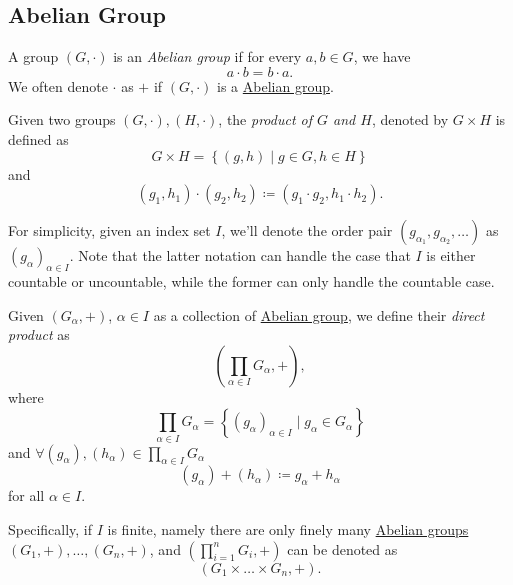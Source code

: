 \subsection{Abelian Group}
\begin{definition}\label{def:Abelian-group}
	A group \((G, \cdot)\) is an \emph{Abelian group} if for every \(a, b\in G\), we have
	\[
		a\cdot b = b\cdot a.
	\]
	We often denote \(\cdot\) as \(+\) if \((G, \cdot)\) is a \hyperref[def:Abelian-group]{Abelian group}.
\end{definition}

\begin{definition}\label{def:product-of-groups}
	Given two groups \((G, \cdot), (H, \cdot)\), the \emph{product of \(G\) and \(H\)}, denoted by \(G\times H\) is defined as
	\[
		G\times H = \left\{(g, h)\mid g\in G, h\in H\right\}
	\]
	and
	\[
		(g_1, h_1)\cdot (g_2, h_2)\coloneqq (g_1\cdot g_2, h_1\cdot h_2).
	\]
\end{definition}

\begin{notation}
	For simplicity, given an index set \(I\), we'll denote the order pair \((g_{\alpha _1}, g_{\alpha _2}, \ldots)\) as \((g_\alpha )_{\alpha \in I}\). Note that
	the latter notation can handle the case that \(I\) is either countable or uncountable, while the former can only handle the countable case.
\end{notation}

\begin{definition}\label{def:direct-product}
	Given \((G_\alpha , +)\), \(\alpha \in I\) as a collection of \hyperref[def:Abelian-group]{Abelian group}, we define their \emph{direct product} as
	\[
		\left(\prod\limits_{\alpha \in I}G_\alpha , + \right),
	\]
	where
	\[
		\prod\limits_{\alpha \in I} G_\alpha = \left\{(g_\alpha )_{\alpha \in I}\mid g_\alpha \in G_\alpha \right\}
	\]
	and \(\forall (g_\alpha ), (h_\alpha )\in \prod\limits_{\alpha \in I} G_\alpha \)
	\[
		(g_\alpha )+(h_\alpha ) \coloneqq g_\alpha + h_\alpha
	\]
	for all \(\alpha \in I\).

	Specifically, if \(I\) is finite, namely there are only finely many \hyperref[def:Abelian-group]{Abelian groups} \((G_1, +),\ldots , (G_n, +)\), and
	\(\left(\prod\limits_{i=1}^{n} G_{i} , +\right)\) can be denoted as
	\[
		\left(G_1 \times \ldots \times G_n, + \right).
	\]
\end{definition}

